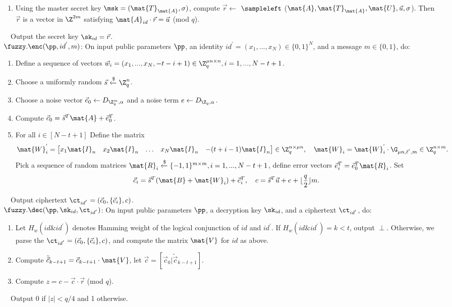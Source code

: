 \documentclass[11pt,hidelinks]{article}
\begin{document}
\begin{appendix}
\begin{enumerate}
\item Using the master secret key $\msk=(\mat{T}_\mat{A},\sigma)$, compute $\vec{r}\leftarrow$ $\sampleleft$ ($\mat{A}, \mat{T}_\mat{A},\mat{U}, \vec{u},\sigma$). Then $\vec{r}$ is a vector in $\Z^{2m}$ satisfying $\mat{A}_{id}\cdot \vec{r}=\vec{u}$ (mod $q$).
\end{enumerate}
~~Output the secret key $\sk_{id}=\vec{r}$.\\[0.4cm]
$\fuzzy.\enc(\pp, id^{'}, m)$: On input public parameters $\pp$, an identity $id^{'}=(x_{1},...,x_{N}) \in \{0,1\}^{N}$, and a message $m \in \{0,1\}$, do:
\begin{enumerate}
\item Define a sequence of vectors $\vec{w}_{i}=(x_{1},...,x_{N},-t-i+1) \in \Z^{\mu n \times n}_{q}, i=1,...,N-t+1$.
\item Choose a uniformly random $\vec{s}\xleftarrow{\$} \Z^{n}_{q}$.
\item Choose a noise vector $\vec{e}_{0}\leftarrow D_{\Z^{m}_{q},\alpha}$ and a noise term $e\leftarrow D_{\Z_{q},\alpha}$.
\item Compute $\vec{c}_{0}=\vec{s}^{T}\mat{A}+\vec{e}^{T}_{0}$.
\item For all $i \in [N-t+1]$ Define the matrix
\begin{equation}
\mat{W}^{'}_{i}= \begin{bmatrix}
x_{1} \mat{I}_{n}&x_{2} \mat{I}_{n}&\ldots&x_{N} \mat{I}_{n}& -(t+i-1)\mat{I}_{n}
\end{bmatrix} \in \Z^{n \times \mu n}_{q},~~~ \mat{W}_{i}=\mat{W}^{'}_{i}\cdot \G_{\mu n,\ell^{'},m} \in \Z^{n \times m}_{q}.
\end{equation}
Pick a sequence of random matrices $\mat{R}_{i}\xleftarrow{\$} \{-1,1\}^{m \times m}, i=1,...,N-t+1$, define error vectors $\vec{e}^{T}_{i}=\vec{e}^{T}_{0}\mat{R}_{i}$. Set
\begin{equation}
\vec{c}_{i}=\vec{s}^{T}(\mat{B}+\mat{W}_{i})+\vec{e}^{T}_{i},~~~c=\vec{s}^{T}\vec{u}+e+\lfloor \frac{q}{2} \rfloor m.
\end{equation}
\end{enumerate}
~~Output ciphertext  $\ct_{id^{'}}=(\vec{c}_{0},\{\vec{c}_{i}\},c)$.\\[0.4cm]
$\fuzzy.\dec(\pp, \sk_{id}, \ct_{id^{'}})$: On input public parameters $\pp$, a decryption key $\sk_{id}$, and a ciphertext $\ct_{id^{'}}$, do:
\begin{enumerate}
\item Let $H_{w}(id \& id^{'})$ denotes Hamming weight of the logical conjunction of $id$ and $id^{'}$. If $H_{w}(id \& id^{'})=k<t$, output $\perp$. Otherwise, we parse the $\ct_{id^{'}}=(\vec{c}_{0},\{\vec{c}_{i}\},c)$, and compute the matrix $\mat{V}$ for $id$ as above.
\item Compute $\tilde{\vec{c}}_{k-t+1}=\vec{c}_{k-t+1}\cdot \mat{V}$, let $\vec{c}=[\vec{c}_{0}|\tilde{\vec{c}}_{k-t+1}]$.
\item Compute $z=c-\vec{c}\cdot \vec{r}$ (mod $q$).
\end{enumerate}
~~Output $0$ if $|z|< q/4$ and 1 otherwise.

\end{appendix}
\end{document}
